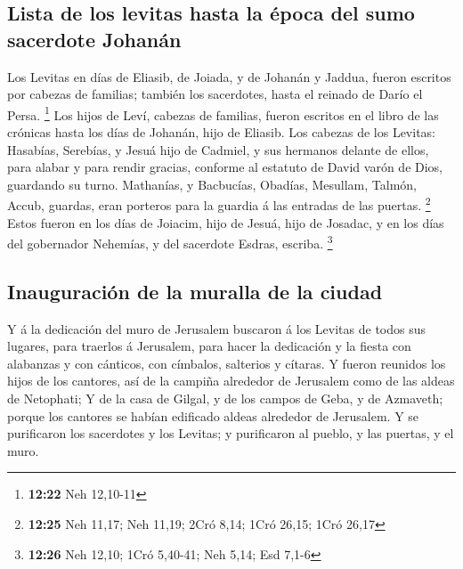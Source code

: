 \hypertarget{lista-de-los-levitas-hasta-la-uxe9poca-del-sumo-sacerdote-johanuxe1n}{%
\subsection{Lista de los levitas hasta la época del sumo sacerdote
Johanán}\label{lista-de-los-levitas-hasta-la-uxe9poca-del-sumo-sacerdote-johanuxe1n}}

 Los Levitas en días de Eliasib, de Joiada, y de Johanán y
Jaddua, fueron escritos por cabezas de familias; también los sacerdotes,
hasta el reinado de Darío el Persa. \footnote{\textbf{12:22} Neh
  12,10-11}  Los hijos de Leví, cabezas de familias, fueron
escritos en el libro de las crónicas hasta los días de Johanán, hijo de
Eliasib.  Los cabezas de los Levitas: Hasabías, Serebías, y
Jesuá hijo de Cadmiel, y sus hermanos delante de ellos, para alabar y
para rendir gracias, conforme al estatuto de David varón de Dios,
guardando su turno.  Mathanías, y Bacbucías, Obadías,
Mesullam, Talmón, Accub, guardas, eran porteros para la guardia á las
entradas de las puertas. \footnote{\textbf{12:25} Neh 11,17; Neh 11,19;
  2Cró 8,14; 1Cró 26,15; 1Cró 26,17}  Estos fueron en los
días de Joiacim, hijo de Jesuá, hijo de Josadac, y en los días del
gobernador Nehemías, y del sacerdote Esdras, escriba. \footnote{\textbf{12:26}
  Neh 12,10; 1Cró 5,40-41; Neh 5,14; Esd 7,1-6}

\hypertarget{inauguraciuxf3n-de-la-muralla-de-la-ciudad}{%
\subsection{Inauguración de la muralla de la
ciudad}\label{inauguraciuxf3n-de-la-muralla-de-la-ciudad}}

 Y á la dedicación del muro de Jerusalem buscaron á los
Levitas de todos sus lugares, para traerlos á Jerusalem, para hacer la
dedicación y la fiesta con alabanzas y con cánticos, con címbalos,
salterios y cítaras.  Y fueron reunidos los hijos de los
cantores, así de la campiña alrededor de Jerusalem como de las aldeas de
Netophati;  Y de la casa de Gilgal, y de los campos de
Geba, y de Azmaveth; porque los cantores se habían edificado aldeas
alrededor de Jerusalem.  Y se purificaron los sacerdotes y
los Levitas; y purificaron al pueblo, y las puertas, y el muro.


